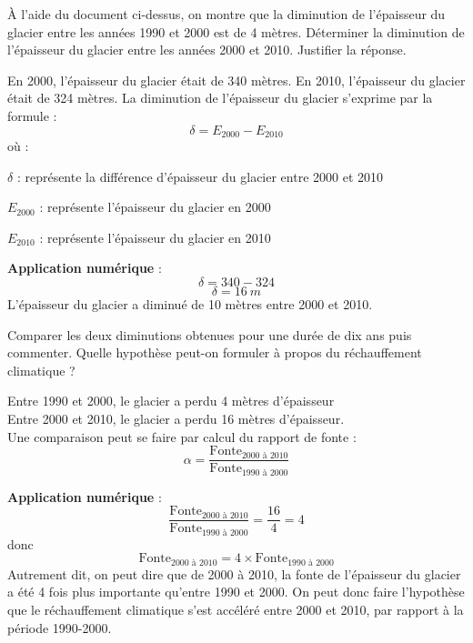 \documentclass[answers]{exam}
\begin{document}
\begin{questions}
  \question[2] À l'aide du document ci-dessus, on montre que la diminution de l'épaisseur du glacier entre les années 1990 et 2000 est de 4 mètres. Déterminer la diminution de l'épaisseur du glacier entre les années 2000 et 2010. Justifier la réponse.
  \begin{solution}
    En 2000, l'épaisseur du glacier était de 340 mètres. En 2010, l'épaisseur du glacier était de 324 mètres. 
    La diminution de l'épaisseur du glacier s'exprime par la formule : 
    \[
    \delta = E_{2000} - E_{2010}
    \]
    où :
\begin{addmargin}[4em]{1em}
  \begin{compactitem}
      \item [$\delta$]: représente la différence d'épaisseur du glacier entre 2000 et 2010
      \item [$E_{2000}$]: représente l'épaisseur du glacier en 2000
      \item [$E_{2010}$]: représente l'épaisseur du glacier en 2010
  \end{compactitem}
\end{addmargin}
\textbf{Application numérique} : 
\[
    \delta = 340 - 324
  \]
  \[
    \delta = \SI{16}{m}
  \]
  L'épaisseur du glacier a diminué de 10 mètres entre 2000 et 2010.
  \end{solution}
  \question[2] Comparer les deux diminutions obtenues pour une durée de dix ans puis commenter. Quelle hypothèse peut-on formuler à propos du réchauffement climatique ?
  \begin{solution}
Entre 1990 et 2000, le glacier a perdu 4 mètres d'épaisseur \\
Entre 2000 et 2010, le glacier a perdu 16 mètres d'épaisseur. \\
Une comparaison peut se faire par calcul du rapport de fonte : 
\[
\alpha = \frac{\text{Fonte}_{2000 \text{ à } 2010}}{\text{Fonte}_{1990 \text{ à } 2000}}
\]

\textbf{Application numérique} : 
\[
  \frac{\text{Fonte}_{2000 \text{ à } 2010}}{\text{Fonte}_{1990 \text{ à } 2000}} = \frac{16}{4} = 4
  \]
donc
  \[
    {\text{Fonte}_{2000 \text{ à } 2010}} = 4 \times \text{Fonte}_{1990 \text{ à } 2000}
  \]
  Autrement dit, on peut dire que de 2000 à 2010, la fonte de l'épaisseur du glacier a été 4 fois plus importante qu'entre 1990 et 2000. On peut donc faire l'hypothèse que le réchauffement climatique s'est accéléré entre 2000 et 2010, par rapport à la période 1990-2000.
  \end{solution}
\end{questions}
\end{document}
